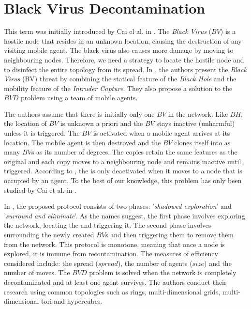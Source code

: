 
\section{Black Virus Decontamination}
This term was initially introduced by Cai el al. in \cite{caietal18}. The {\it Black Virus} ($BV$) is a hostile node that resides in an unknown location, causing the destruction of any visiting mobile agent. The black virus also causes more damage by moving to neighbouring nodes. Therefore, we need a strategy to locate the hostile node and to disinfect the entire topology from its spread.
In \cite{caietal18}, the authors present the {\it Black Virus} (BV) threat by combining the statical feature of the {\it Black Hole} and the mobility feature of the {\it Intruder Capture}. They also propose a solution to the $BVD$ problem using a team of mobile agents. 

The authors assume that there is initially only one $BV$ in the network. Like $BH$, the location of $BV$ is unknown a priori and the $BV$  stays inactive (unharmful) unless it is triggered. The $BV$ is activated when a mobile agent arrives at its location. The mobile agent is then destroyed and the $BV$ clones itself into as many $BV$s as its number of degrees. The copies retain the same features as the original and each copy moves to a neighbouring node and remains inactive until triggered. According to \cite{caietal18}, the \bv is only deactivated when it moves to a node that is occupied by an agent. To the best of our knowledge, this problem has only been studied by Cai et al. in \cite{caietal18}.

In \cite{caietal18}, the proposed protocol consists of two phases: '{\em shadowed exploration}' and '{\em surround and eliminate}'. As the names suggest, the first phase involves exploring  the network, locating the \bv and triggering it. The second phase involves surrounding the newly created $BV$s and then triggering them to remove them from the network. This protocol is monotone, meaning that once a node is explored, it is immune from recontamination. The measures of efficiency considered include:  the spread ($spread$), the number of agents ($size$) and the number of moves.
The $BVD$ problem is solved when the network is completely decontaminated and at least one agent survives.
 The authors conduct their research using common topologies such as rings, multi-dimensional grids, multi-dimensional tori and hypercubes.

